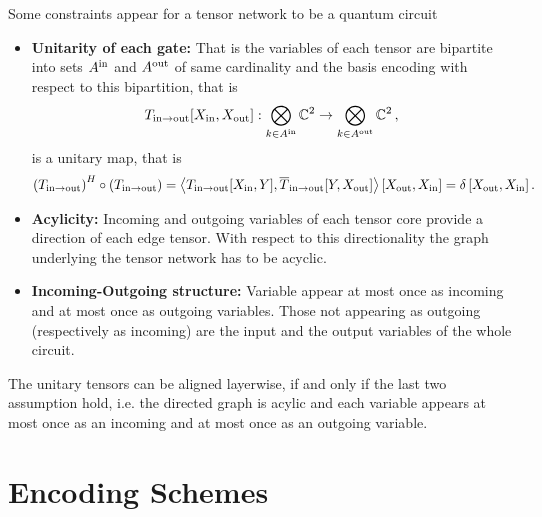 \documentclass[aps,onecolumn,nofootinbib,pra]{article}
\begin{document}
    Some constraints appear for a tensor network to be a quantum circuit
    \begin{itemize}
        \item \textbf{Unitarity of each gate:} That is the variables of each tensor are bipartite into sets $A^{\mathrm{in}}$ and $A^{\mathrm{out}}$ of same cardinality and the basis encoding with respect to this bipartition, that is
        \begin{align*}
            T_{\mathrm{in} \rightarrow \mathrm{out}}[X_{\mathrm{in}},X_{\mathrm{out}}] : \bigotimes_{k\in A^{\mathrm{in}}} \mathbb{C}^2 \rightarrow \bigotimes_{k\in A^{\mathrm{out}}} \mathbb{C}^2  \, ,
        \end{align*}
        is a unitary map, that is
        \begin{align*}
            \left(T_{\mathrm{in} \rightarrow \mathrm{out}}\right)^H \circ \left(T_{\mathrm{in} \rightarrow \mathrm{out}}\right)
            = \left\langle 
                T_{\mathrm{in} \rightarrow \mathrm{out}}[X_{\mathrm{in}},Y],
                \overline{T}_{\mathrm{in} \rightarrow \mathrm{out}}[Y,X_{\mathrm{out}}]
            \right\rangle \left[ X_{\mathrm{out}},X_{\mathrm{in}} \right]
            = \delta\left[X_{\mathrm{out}},X_{\mathrm{in}}\right].
        \end{align*}
        \item \textbf{Acylicity:} Incoming and outgoing variables of each tensor core provide a direction of each edge tensor. With respect to this directionality the graph underlying the tensor network has to be acyclic.
        \item \textbf{Incoming-Outgoing structure:} Variable appear at most once as incoming and at most once as outgoing variables.
        Those not appearing as outgoing (respectively as incoming) are the input and the output variables of the whole circuit.
    \end{itemize}

    The unitary tensors can be aligned layerwise, if and only if the last two assumption hold, i.e. the directed graph is acylic and each variable appears at most once as an incoming and at most once as an outgoing variable.
    
    \section{Encoding Schemes}
\end{document}
